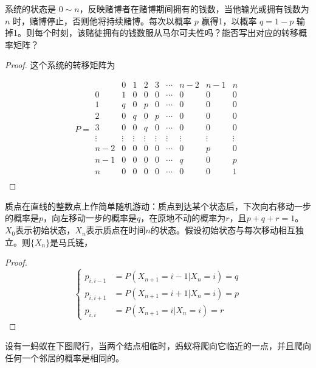 \documentclass[lang=cn,10pt,thmcnt=section]{elegantbook}
\begin{document}
\begin{example}[赌徒破产问题]
	系统的状态是 \(0 \sim n\)，反映赌博者在赌博期间拥有的钱数，当他输光或拥有钱数为 \(n\) 时，赌博停止，否则他将持续赌博。每次以概率 \(p\) 赢得1，以概率 \(q = 1 - p\) 输掉1。则每个时刻，该赌徒拥有的钱数服从马尔可夫性吗？能否写出对应的转移概率矩阵？
\end{example}
\begin{proof}
	这个系统的转移矩阵为

\[
P = 
\begin{array}{c|ccccccccc}
 & 0 & 1 & 2 & 3 & \cdots & n-2 & n-1 & n \\
\hline
0 & 1 & 0 & 0 & 0 & \cdots & 0 & 0 & 0 \\
1 & q & 0 & p & 0 & \cdots & 0 & 0 & 0 \\
2 & 0 & q & 0 & p & \cdots & 0 & 0 & 0 \\
3 & 0 & 0 & q & 0 & \cdots & 0 & 0 & 0 \\
\vdots & \vdots & \vdots & \vdots & \vdots & \vdots & \vdots & \vdots & \vdots \\
n-2 & 0 & 0 & 0 & 0 & \cdots & 0 & p & 0 \\
n-1 & 0 & 0 & 0 & 0 & \cdots & q & 0 & p \\
n & 0 & 0 & 0 & 0 & \cdots & 0 & 0 & 1 \\
\end{array}
\]
\end{proof}
\begin{example}[简单随机游动]
	质点在直线的整数点上作简单随机游动：质点到达某个状态后，下次向右移动一步的概率是$p$，向左移动一步的概率是$q$，在原地不动的概率为$r$，且$p + q + r = 1$。$X_0$表示初始状态，$X_n$表示质点在时间$n$的状态。假设初始状态与每次移动相互独立。则$\{X_n\}$是马氏链，
\end{example}
\begin{proof}
	\[
\left\{
\begin{aligned}
p_{i, i-1} &= P(X_{n+1} = i - 1 | X_n = i) = q \\
p_{i, i+1} &= P(X_{n+1} = i + 1 | X_n = i) = p \\
p_{i, i} &= P(X_{n+1} = i | X_n = i) = r
\end{aligned}
\right.
\]
\end{proof}
\begin{example}
	设有一蚂蚁在下图爬行，当两个结点相临时，蚂蚁将爬向它临近的一点，并且爬向任何一个邻居的概率是相同的。

\begin{figure}[h]
    \centering
\end{figure}
\end{example}
\end{document}
